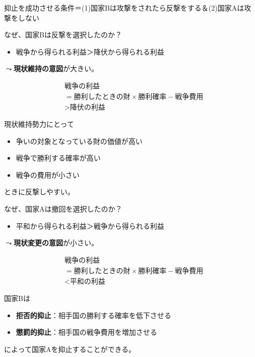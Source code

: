 \documentclass[
  xelatex,
  ja=standard]{bxjsarticle}
\providecommand{\tightlist}{%
  \setlength{\itemsep}{0pt}\setlength{\parskip}{0pt}}\usepackage{longtable,booktabs,array}
\begin{document}
抑止を成功させる条件＝(1)国家Bは攻撃をされたら反撃をする＆(2)国家Aは攻撃をしない

なぜ、国家Bは反撃を選択したのか？

\begin{itemize}
\tightlist
\item
  戦争から得られる利益＞降伏から得られる利益
\end{itemize}

\(\leadsto\)\textbf{現状維持の意図}が大きい。

\[
\begin{split}
&\textrm{戦争の利益} \\
&= \textrm{勝利したときの財} \times \textrm{勝利確}率 - \textrm{戦争費用} \\
&> \textrm{降伏の利益}
\end{split}
\]

現状維持勢力にとって

\begin{itemize}
\tightlist
\item
  争いの対象となっている財の価値が高い
\item
  戦争で勝利する確率が高い
\item
  戦争の費用が小さい
\end{itemize}

ときに反撃しやすい。

なぜ、国家Aは撤回を選択したのか？

\begin{itemize}
\tightlist
\item
  平和から得られる利益＞戦争から得られる利益
\end{itemize}

\(\leadsto\)\textbf{現状変更の意図}が小さい。

\[
\begin{split}
&\textrm{戦争の利益} \\
&= \textrm{勝利したときの財} \times \textrm{勝利確}率 - \textrm{戦争費用} \\
&< \textrm{平和の利益}
\end{split}
\]

国家Bは

\begin{itemize}
\tightlist
\item
  \textbf{拒否的抑止}：相手国の勝利する確率を低下させる
\item
  \textbf{懲罰的抑止}：相手国の戦争費用を増加させる
\end{itemize}

によって国家Aを抑止することができる。
\end{document}

